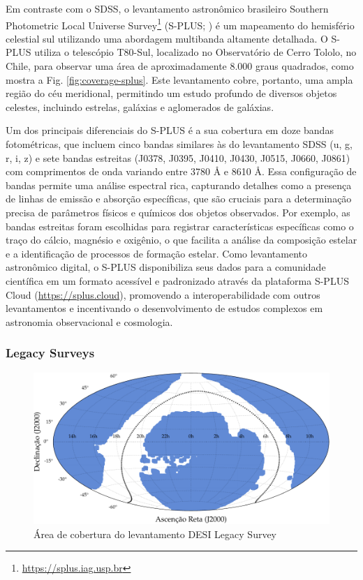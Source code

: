 Em contraste com o SDSS, o levantamento astronômico brasileiro Southern Photometric Local Universe Survey\footnote{\url{https://splus.iag.usp.br}} (S-PLUS; \citealp{splus}) é um mapeamento do hemisfério celestial sul utilizando uma abordagem multibanda altamente detalhada. O S-PLUS utiliza o telescópio T80-Sul, localizado no Observatório de Cerro Tololo, no Chile, para observar uma área de aproximadamente 8.000 graus quadrados, como mostra a Fig. \ref{fig:coverage-splus}. Este levantamento cobre, portanto, uma ampla região do céu meridional, permitindo um estudo profundo de diversos objetos celestes, incluindo estrelas, galáxias e aglomerados de galáxias.

Um dos principais diferenciais do S-PLUS é a sua cobertura em doze bandas fotométricas, que incluem cinco bandas similares às do levantamento SDSS (u, g, r, i, z) e sete bandas estreitas (J0378, J0395, J0410, J0430, J0515, J0660, J0861) com comprimentos de onda variando entre 3780 $\si{\angstrom}$ e 8610 $\si{\angstrom}$. Essa configuração de bandas permite uma análise espectral rica, capturando detalhes como a presença de linhas de emissão e absorção específicas, que são cruciais para a determinação precisa de parâmetros físicos e químicos dos objetos observados. Por exemplo, as bandas estreitas foram escolhidas para registrar características específicas como o traço do cálcio, magnésio e oxigênio, o que facilita a análise da composição estelar e a identificação de processos de formação estelar. Como levantamento astronômico digital, o S-PLUS disponibiliza seus dados para a comunidade científica em um formato acessível e padronizado através da plataforma S-PLUS Cloud (\url{https://splus.cloud}), promovendo a interoperabilidade com outros levantamentos e incentivando o desenvolvimento de estudos complexos em astronomia observacional e cosmologia.




\subsubsection{Legacy Surveys}
\label{sec:legacy}
\begin{figure}[!ht]
  \includegraphics[width=\linewidth]{notebooks/plots/legacy_footprint.pdf}
  \caption{Área de cobertura do levantamento DESI Legacy Survey}
  \label{fig:coverage-legacy}
\end{figure}


